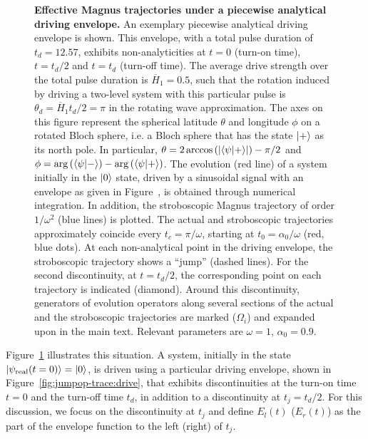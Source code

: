 \begin{figure}[tb]
	\caption{\textbf{Effective Magnus trajectories under a piecewise analytical driving envelope.}  An exemplary piecewise analytical driving envelope is shown. This envelope, with a total pulse duration of $t_d = 12.57$, exhibits non-analyticities at $t=0$ (turn-on time), $t=t_d/2$ and $t=t_d$ (turn-off time). The average drive strength over the total pulse duration is $\overline{H}_1 = 0.5$, such that the rotation induced by driving a two-level system with this particular pulse is $\theta_d = \overline{H}_1t_d/2=\pi$ in the rotating wave approximation.  The axes on this figure represent the spherical latitude $\theta$ and longitude $\phi$ on a rotated Bloch sphere, i.e. a Bloch sphere that has the state $\ket{+}$ as its north pole. In particular, $\theta = 2 \arccos\left(\left|\braket{\psi|+}\right|\right) - \pi/2$ and $\phi = \arg\left(\braket{\psi|-}\right) - \arg\left(\braket{\psi|+}\right)$. The evolution (red line) of a system initially in the $\ket{0}$ state, driven by a sinusoidal signal with an envelope as given in Figure~, is obtained through numerical integration. In addition, the stroboscopic Magnus trajectory of order $1/\omega^2$ (blue lines) is plotted. The actual and stroboscopic trajectories approximately coincide every $t_c=\pi / \omega$, starting at $t_0 = \alpha_0/\omega$ (red, blue dots). At each non-analytical point in the driving envelope, the stroboscopic trajectory shows a ``jump'' (dashed lines). For the second discontinuity, at $t = t_d/2$, the corresponding point on each trajectory is indicated (diamond). Around this discontinuity, generators of evolution operators along several sections of the actual and the stroboscopic trajectories are marked ($\Omega_i$) and expanded upon in the main text. Relevant parameters are $\omega = 1$, $\alpha_0 = 0.9$. }
	\label{fig:jumpop-trace}
\end{figure}

Figure~\ref{fig:jumpop-trace} illustrates this situation. A system, initially in the state $\ket{\psi_{\text{real}}(t=0)}=\ket{0}$, is driven using a particular driving envelope, shown in Figure~\ref{fig:jumpop-trace:drive}, that exhibits discontinuities at the turn-on time $t=0$ and the turn-off time $t_d$, in addition to a discontinuity at $t_j = t_d/2$. For this discussion, we focus on the discontinuity at $t_j$ and define $E_l(t)$ ($E_r(t)$) as the part of the envelope function to the left (right) of $t_j$. 

